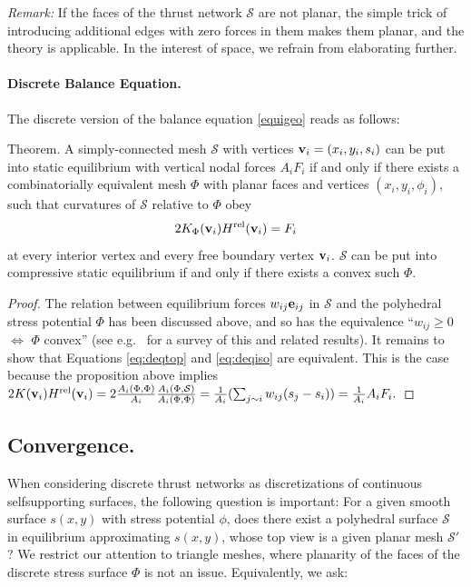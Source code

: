 \documentclass[review]{acmsiggraph}
\def\rel{{\mathord{{\rm rel}}}}
\def\SS{{\mathcal S}}
\begin{document}
{\em Remark:} If the faces of the thrust network $\SS$ are not planar,
the simple trick of introducing additional edges with zero forces in them
makes them planar, and the theory is applicable. In the interest of space, we refrain from elaborating further.


\paragraph{Discrete Balance Equation.}

The discrete version of the balance equation \eqref{equigeo} reads as
follows:

\proclaim Theorem.
 A simply-connected mesh $\SS$ with vertices ${\mathbf v}_i=(x_i,y_i,s_i)$
can be put into static equilibrium with vertical nodal forces $A_iF_i$ if
and only if there exists a combinatorially equivalent mesh $\Phi$ with
planar faces and vertices $(x_i,y_i,\phi_i)$, such that curvatures of
$\SS$ relative to $\Phi$ obey
	\begin{equation}
	2 K_\Phi(\vw_i) H^\rel(\vw_i) = F_i
	\label{eq:deqiso}
	\end{equation}
 at every interior vertex and every free boundary vertex ${\mathbf v}_i$. $\SS$
can be put into compressive static equilibrium if and only if there exists
a convex such $\Phi$.

\begin{proof} The relation between equilibrium forces $w_{ij}{\mathbf e}_{ij}$ in
$\SS$ and the polyhedral stress potential $\Phi$ has been discussed above,
and so has the equivalence ``$w_{ij}\ge 0$ $\iff$ $\Phi$ convex'' (see
e.g.\ \cite{Ash1988} for a survey of this and related results). It remains
to show that Equations \eqref{eq:deqtop} and \eqref{eq:deqiso} are
equivalent. This is the case because the proposition above implies
	$
	2 K(\vw_i) H^\rel(\vw_i) =
	2 \frac{A_i(\Phi,\Phi)}{A_i}
	\frac{A_i(\Phi,\SS)}{A_i(\Phi,\Phi)} =
	{1\over A_i}
	(\sum_{j\sim i} w_{ij} (s_j-s_i))
	= {1\over A_i} A_i F_i.
	$
	\end{proof}

\subsection{Convergence.}

When considering discrete thrust networks as discretizations of continuous
self\dash supporting surfaces, the following question is important: For a
given smooth surface $s(x,y)$ with stress potential $\phi$, does there
exist a polyhedral surface $\SS$ in equilibrium approximating $s(x,y)$,
whose top view is a given planar mesh $\SS'$? We restrict our attention to
triangle meshes, where planarity of the faces of the discrete stress
surface $\Phi$ is not an issue. Equivalently, we ask:
\end{document}
